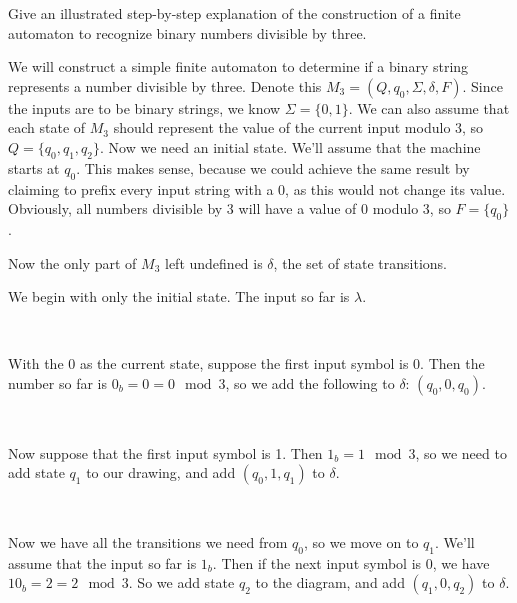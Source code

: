 \documentclass{bcthesis}
\newenvironment{exstep}[1]
		{
			\begin{minipage}{0.5 \textwidth}
				#1
			\end{minipage} \begin{minipage}{0.5 \paperwidth}
		}
		{
			\end{minipage}\\[0.5 em]
		}
\begin{document}
	\begin{example}
		Give an illustrated step-by-step explanation of the construction of a finite automaton to recognize binary numbers divisible by three.

		We will construct a simple finite automaton to determine if a binary string represents a number divisible by three.
	Denote this $M_3 = (Q, q_0, \Sigma, \delta, F)$.
	Since the inputs are to be binary strings, we know $\Sigma = \{ 0, 1 \}$.
	We can also assume that each state of $M_3$ should represent the value of the current input modulo 3, so $Q = \{q_0, q_1, q_2\}$.
	Now we need an initial state. 
	We'll assume that the machine starts at $q_0$. 
	This makes sense, because we could achieve the same result by claiming to prefix every input string with a 0, as this would not change its value.
	Obviously, all numbers divisible by 3 will have a value of 0 modulo 3, so $F = \{q_0\}$.

	Now the only part of $M_3$ left undefined is $\delta$, the set of state transitions.

		\begin{exstep}
			{
				We begin with only the initial state.
				The input so far is $\lambda$.
			}
			
		\end{exstep}

		\begin{exstep}
			{
				With the 0 as the current state, suppose the first input symbol is 0. 
				Then the number so far is $0_b = 0 = 0 \mod 3$, so we add the following to $\delta$: $(q_0, 0, q_0)$.
			}
			
		\end{exstep}

		\begin{exstep}
			{
				Now suppose that the first input symbol is 1. 
				Then $1_b = 1 \mod 3$, so we need to add state $q_1$ to our drawing, and add $(q_0, 1, q_1)$ to $\delta$.
			}
			
		\end{exstep}

		\begin{exstep}
			{
				Now we have all the transitions we need from $q_0$, so we move on to $q_1$.
				We'll assume that the input so far is $1_b$.
				Then if the next input symbol is $0$, we have $10_b = 2 = 2 \mod 3$.
				So we add state $q_2$ to the diagram, and add $(q_1, 0, q_2)$ to $\delta$.
			}
			
		\end{exstep}


\end{example}
\end{document}
